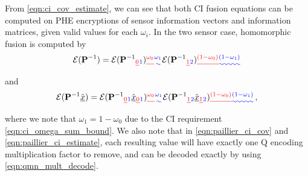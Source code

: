 \documentclass[letterpaper, 10 pt, conference]{ieeeconf}  %
\providecommand{\DIFadd}[1]{{\protect\color{blue}\uwave{#1}}} %
\providecommand{\DIFdel}[1]{{\protect\color{red}\sout{#1}}}                      %
\providecommand{\DIFaddbegin}{} %
\providecommand{\DIFaddend}{} %
\providecommand{\DIFdelbegin}{} %
\providecommand{\DIFdelend}{} %
\begin{document}
From \eqref{eqn:ci_cov_estimate}, we can see that both CI fusion equations can be computed on PHE encryptions of sensor information vectors and information matrices, given valid values for each $\omega_i$. In the two sensor case, homomorphic fusion is computed by
\begin{equation}
   \mathcal{E}(\mP^{-1}) = \mathcal{E}(\mP^{-1}\DIFdelbegin \DIFdel{_0}\DIFdelend \DIFaddbegin \DIFadd{_1}\DIFaddend )\DIFdelbegin \DIFdel{^{\omega_0}}\DIFdelend \DIFaddbegin \DIFadd{^{\omega_1}}\DIFaddend \mathcal{E}(\mP^{-1}\DIFdelbegin \DIFdel{_1}\DIFdelend \DIFaddbegin \DIFadd{_2}\DIFaddend )\DIFdelbegin \DIFdel{^{(1 -\omega_0)} }\DIFdelend \DIFaddbegin \DIFadd{^{(1 -\omega_1)} }\DIFaddend \label{eqn:paillier_ci_cov}
\end{equation}
and
\begin{equation}
   \mathcal{E}(\mP^{-1}\mean{\vec{x}}) = \mathcal{E}(\mP^{-1}\DIFdelbegin \DIFdel{_0}\DIFdelend \DIFaddbegin \DIFadd{_1}\DIFaddend \mean{\vec{x}}\DIFdelbegin \DIFdel{_0}\DIFdelend \DIFaddbegin \DIFadd{_1}\DIFaddend )\DIFdelbegin \DIFdel{^{\omega_0}}\DIFdelend \DIFaddbegin \DIFadd{^{\omega_1}}\DIFaddend \mathcal{E}(\mP^{-1}\DIFdelbegin \DIFdel{_1}\DIFdelend \DIFaddbegin \DIFadd{_2}\DIFaddend \mean{\vec{x}}\DIFdelbegin \DIFdel{_1}\DIFdelend \DIFaddbegin \DIFadd{_2}\DIFaddend )\DIFdelbegin \DIFdel{^{(1 - \omega_0)}}\DIFdelend \DIFaddbegin \DIFadd{^{(1 - \omega_1)}}\DIFaddend \,, \label{eqn:paillier_ci_estimate}
\end{equation}
where we note that \DIFdelbegin \DIFdel{$\omega_1=1-\omega_0$ }\DIFdelend \DIFaddbegin \DIFadd{$\omega_2=1-\omega_1$ }\DIFaddend due to the CI requirement \eqref{eqn:ci_omega_sum_bound}. We also note that in \eqref{eqn:paillier_ci_cov} and \eqref{eqn:paillier_ci_estimate}, each resulting value will have exactly one Q encoding multiplication factor to remove, and can be decoded exactly by using \eqref{eqn:qmn_mult_decode}.
\end{document}
